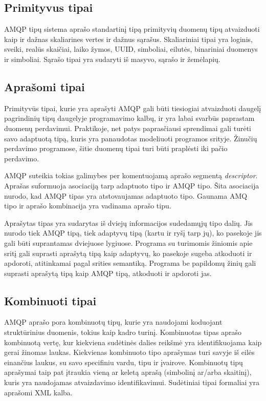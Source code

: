 \documentclass[12pt, a4paper, lithuanian]{article}
\begin{document}
    \subsection{Primityvus tipai}

    AMQP tipų sistema aprašo standartinį tipą primityvių duomenų tipų atvaizduoti kaip ir dažnas skaliarines vertes ir dažnus sąrašus.
    Skaliariniai tipai yra loginis, sveiki, realūs skaičiai, laiko žymos, UUID, simboliai, eilutės, binariniai duomenys ir simboliai.
    Sąrašo tipai yra sudaryti iš masyvo, sąrašo ir žemėlapių.

    \subsection{Aprašomi tipai}

    Primityvūs tipai, kurie yra aprašyti AMQP gali būti tiesiogiai atvaizduoti daugelį pagrindinių tipų daugelyje programavimo kalbų, ir yra labai svarbūs paprastam duomenų perdavimui.
    Praktikoje, net patys paprasčiausi sprendimai gali turėti savo adaptuotą tipą, kuris yra panaudotas modeliuoti programos srityje.
    Žinučių perdavimo programose, šitie duomenų tipai turi būti praplėsti iki pačio perdavimo.

    AMQP suteikia tokias galimybes per komentuojamą aprašo segmentą \textit{descriptor}.
    Aprašas suformuoja asociaciją tarp adaptuoto tipo ir AMQP tipo.
    Šita asociacija nurodo, kad AMQP tipas yra atstovaujamas adaptuoto tipo.
    Gaunama AMQ tipo ir aprašo kombinacija yra vadinama aprašo tipu.

    Aprašytas tipas yra sudarytas iš dviejų informacijos sudedamųjų tipo dalių.
    Jis nurodo tiek AMQP tipą, tiek adaptyvų tipą (kartu ir ryšį tarp jų), ko pasekoje jis gali būti suprantamas dviejuose lygiuose.
    Programa su turimomis žiniomis apie sritį gali suprasti aprašytą tipą kaip adaptyvų, ko pasekoje sugeba atkoduoti ir apdoroti, atitinkamai pagal srities semantiką.
    Programa be papildomų žinių gali suprasti aprašytą tipą kaip AMQP tipą, atkoduoti ir apdoroti jas.

    \subsection{Kombinuoti tipai}

    AMQP aprašo pora kombinuotų tipų, kurie yra naudojami koduojant struktūrinius duomenis, tokius kaip kadro turinį.
    Kombinuotas tipas aprašo kombinuotą vertę, kur kiekviena sudėtinės dalies reikšmė yra identifikuojama kaip gerai žinomas laukas.
    Kiekvienas kombinuoto tipo aprašymas turi savyje iš eilės einančius laukus, su savo specifiniu vardu, tipu ir įvairove.
    Kombinuotų tipų aprašymai taip pat įtraukia vieną ar keletą aprašą (simbolinį ar/arba skaitinį), kuris yra naudojamas atvaizdavimo identifikavimui.
    Sudėtiniai tipai formaliai yra aprašomi XML kalba.
\end{document}
